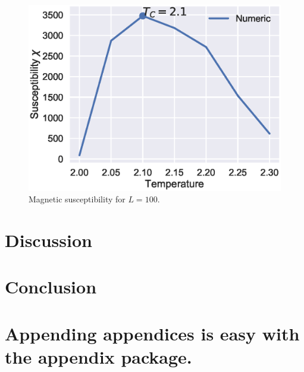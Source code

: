 \documentclass[aps,reprint]{revtex4-1}
\newcommand\blankpage{%
  \null
  \thispagestyle{empty}%
  \addtocounter{page}{-1}%
  \newpage}
\begin{document}
\begin{figure}[H]
  \centering
  \includegraphics[width=\columnwidth]{figures/L100sus.eps}
  \caption{\label{fig:100CVTc} Magnetic susceptibility for \(L=100\).}
\end{figure}
\section{Discussion}
\label{sec:discussion}

\section{Conclusion}
\label{sec:conclusion}


\blankpage
\appendix
\section{Appending appendices is easy with the appendix package.}
\blankpage
\end{document}
